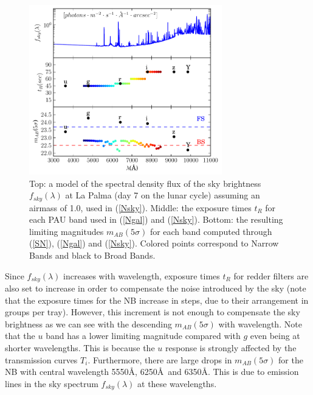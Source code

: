 \begin{figure}
\centering
\includegraphics[width=84mm]{./plots/pau_lim_mag.pdf}
\caption{Top: a model of the spectral density flux of the sky brightness $f_{sky}(\lambda)$ at La Palma (day 7 on the lunar cycle) assuming an airmass of 1.0, used in (\ref{Nsky}). Middle: the exposure times $t_R$ for each PAU band used in (\ref{Ngal}) and (\ref{Nsky}). Bottom: the resulting limiting magnitudes $m_{AB}(5\sigma)$ for each band computed through (\ref{SN}), (\ref{Ngal}) and (\ref{Nsky}). Colored points correspond to Narrow Bands and black to Broad Bands.}
\label{pau_lim_mag}
\end{figure}
Since $f_{sky}(\lambda)$ increases with wavelength, exposure times $t_R$ for redder filters are also set to increase in order to compensate the noise introduced by the sky (note that the exposure times for the NB increase in steps, due to their arrangement in groups per tray). However, this increment is not enough to compensate the sky brightness as we can see with the descending $m_{AB}(5\sigma)$ with wavelength. Note that the $u$ band has a lower limiting magnitude compared with $g$ even being at shorter wavelengths. This is because the $u$ response is strongly affected by the transmission curves $T_i$. Furthermore, there are large drops in $m_{AB}(5\sigma)$ for the NB with central wavelength 5550\AA, 6250\AA \ and 6350\AA. This is  due to emission lines in the sky spectrum $f_{sky}(\lambda)$ at these wavelengths.
